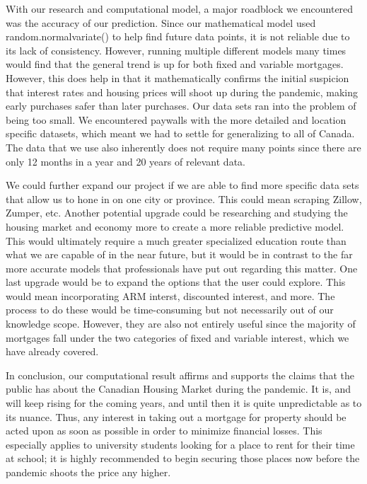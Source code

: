 \documentclass[fontsize=11pt]{article}
\begin{document}
With our research and computational model, a major roadblock we encountered was the accuracy of our prediction. Since our mathematical model used random.normalvariate() to help find future data points, it is not reliable due to its lack of consistency. However, running multiple different models many times would find that the general trend is up for both fixed and variable mortgages. However, this does help in that it mathematically confirms the initial suspicion that interest rates and housing prices will shoot up during the pandemic, making early purchases safer than later purchases. Our data sets ran into the problem of being too small. We encountered paywalls with the more detailed and location specific datasets, which meant we had to settle for generalizing to all of Canada. The data that we use also inherently does not require many points since there are only 12 months in a year and 20 years of relevant data.

We could further expand our project if we are able to find more specific data sets that allow us to hone in on one city or province. This could mean scraping Zillow, Zumper, etc. Another potential upgrade could be researching and studying the housing market and economy more to create a more reliable predictive model. This would ultimately require a much greater specialized education route than what we are capable of in the near future, but it would be in contrast to the far more accurate models that professionals have put out regarding this matter. One last upgrade would be to expand the options that the user could explore. This would mean incorporating ARM interst, discounted interest, and more. The process to do these would be time-consuming but not necessarily out of our knowledge scope. However, they are also not entirely useful since the majority of mortgages fall under the two categories of fixed and variable interest, which we have already covered.

In conclusion, our computational result affirms and supports the claims that the public has about the Canadian Housing Market during the pandemic. It is, and will keep rising for the coming years, and until then it is quite unpredictable as to its nuance. Thus, any interest in taking out a mortgage for property should be acted upon as soon as possible in order to minimize financial losses. This especially applies to university students looking for a place to rent for their time at school; it is highly recommended to begin securing those places now before the pandemic shoots the price any higher.
\end{document}
